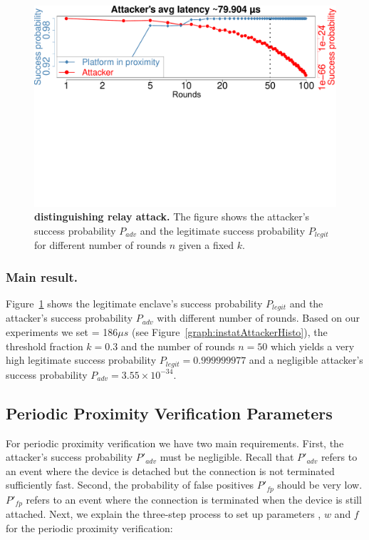 \begin{figure}[h]
  \centering
    \includegraphics[trim={0 12.8cm 0 0}, clip, width=0.9\linewidth]{chapters/ProximiTEE/figures/InstantAttackerSuccess.pdf}
    \caption[\name distinguishing relay attack]{\textbf{\name distinguishing relay attack.} The figure shows the attacker's success probability $P_{adv}$ and the legitimate success probability $P_{legit}$ for different number of rounds $n$ given a fixed $k$.}

    \label{graph:instantAttackerSuccess}
\end{figure}


\subsubsection{Main result.} Figure~\ref{graph:instantAttackerSuccess} shows the legitimate enclave's success probability $P_{legit}$ and the attacker's success probability $P_{adv}$ with different number of rounds. Based on our experiments we set \connect= 186$\mu s$ (see Figure~\ref{graph:instatAttackerHisto}), the threshold fraction $k=0.3$ and the number of rounds $n=50$ which yields a very high legitimate success probability $P_{legit}=0.999999977$ and a negligible attacker's success probability $P_{adv}=3.55\times 10^{-34}$.





\subsection{Periodic Proximity Verification Parameters}
\label{sec:evaluationL:continuousParameters}


For periodic proximity verification we have two main requirements. First, the attacker's success probability $P'_{adv}$ must be negligible. Recall that $P'_{adv}$ refers to an event where the device is detached but the connection is not terminated sufficiently fast. Second, the probability of false positives $P'_{fp}$ should be very low. $P'_{fp}$ refers to an event where the connection is terminated when the device is still attached. Next, we explain the three-step process to set up parameters \detach, $w$ and $f$ for the periodic proximity verification:

